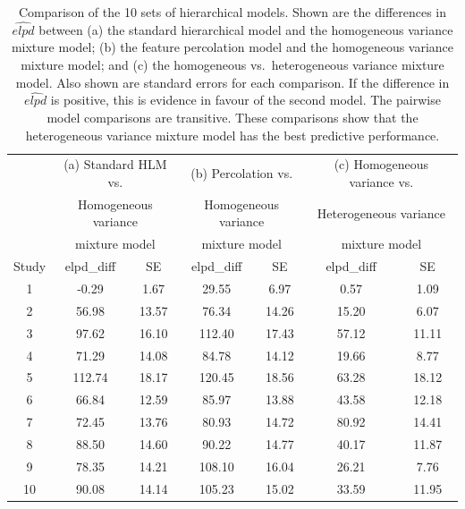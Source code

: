 \documentclass{cambridge7A}\usepackage[]{graphicx}\usepackage[]{color}
\begin{document}
\begin{table}[!htbp]
\begin{center}
\begin{tabular}{ccccccc}
      & \multicolumn{2}{c}{(a) Standard HLM vs.} & \multicolumn{2}{c}{(b) Percolation vs.} & \multicolumn{2}{c}{(c) Homogeneous variance vs.}\\
      & \multicolumn{2}{c}{Homogeneous variance} & \multicolumn{2}{c}{Homogeneous variance} & \multicolumn{2}{c}{Heterogeneous variance}\\
            & \multicolumn{2}{c}{mixture model} & \multicolumn{2}{c}{mixture model} & \multicolumn{2}{c}{mixture model}\\
Study & elpd\_diff & SE &    elpd\_diff & SE & elpd\_diff & SE \\ 
   1 & -0.29 & 1.67     &    29.55 & 6.97    & 0.57 & 1.09 \\ 
  2 & 56.98 & 13.57     &    76.34 & 14.26   & 15.20 & 6.07 \\ 
   3 & 97.62 & 16.10    &    112.40 & 17.43  & 57.12 & 11.11 \\ 
  4 & 71.29 & 14.08     &    84.78 & 14.12   & 19.66 & 8.77 \\ 
   5 & 112.74 & 18.17   &    120.45 & 18.56  & 63.28 & 18.12 \\ 
  6 & 66.84 & 12.59     &    85.97 & 13.88   & 43.58 & 12.18 \\ 
   7 & 72.45 & 13.76    &    80.93 & 14.72   & 80.92 & 14.41 \\ 
  8 & 88.50 & 14.60     &    90.22 & 14.77   & 40.17 & 11.87 \\ 
  9 & 78.35 & 14.21     &    108.10 & 16.04  & 26.21 & 7.76 \\ 
  10 & 90.08 & 14.14    &   105.23 & 15.02   & 33.59 & 11.95 \\ 
\end{tabular}
\end{center}
\caption{Comparison of the 10 sets of hierarchical models. Shown are the differences in $\widehat{elpd}$ between (a) the standard hierarchical model and the homogeneous variance mixture model; (b) the feature percolation model and the homogeneous variance mixture model; and (c) the homogeneous vs.\ heterogeneous variance mixture model. Also shown are standard errors for each comparison. If the difference in $\widehat{elpd}$ is positive, this is evidence in favour of the second model. The pairwise model comparisons are transitive. These comparisons show that the heterogeneous variance mixture model has the best predictive performance.}\label{tab:allcomparisons}
\end{table}
\end{document}
